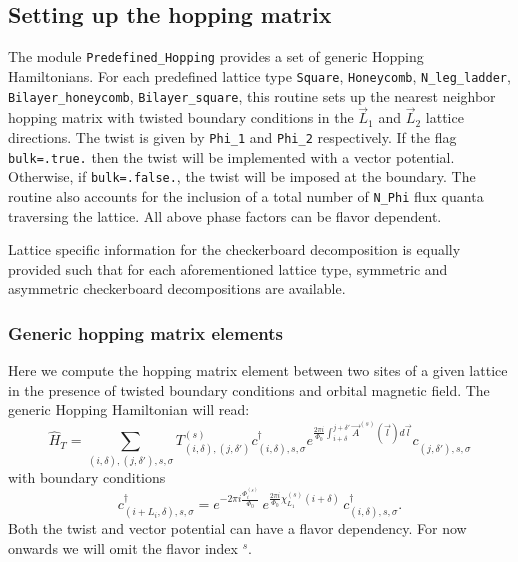 %
\subsection{ Setting up the hopping matrix }

The module \texttt{Predefined\_Hopping}   provides a set of generic Hopping Hamiltonians.    For each  predefined lattice type 
\texttt{Square}, \texttt{Honeycomb}, \texttt{N\_leg\_ladder},  \texttt{Bilayer\_honeycomb},  \texttt{Bilayer\_square},
    this routine sets  up the nearest  neighbor hopping matrix with twisted boundary conditions in the $\vec{L}_1$ and $\vec{L}_2$ lattice directions. The twist is given by 
\texttt{Phi\_1}  and \texttt{Phi\_2}  respectively.  If the flag  \texttt{bulk=.true.}   then   the twist will be implemented with a vector potential. Otherwise, if  \texttt{bulk=.false.}, the twist will be imposed at the boundary.   The routine also accounts for  the inclusion of a  total number of \texttt{N\_Phi}  flux quanta traversing the lattice.   All above phase factors  can be flavor dependent.  

Lattice specific information for the checkerboard  decomposition is   equally   provided such that for each aforementioned lattice type,  symmetric and asymmetric  checkerboard decompositions  are available.    

\subsubsection{Generic hopping matrix elements}\label{sec:generic_hopping}


Here we compute the hopping matrix element  between two sites of a given lattice  in the presence of twisted boundary conditions and  orbital magnetic field. 
The generic Hopping Hamiltonian will read: 
\begin{equation}
	   \hat{H}_T = \sum_{(i,\delta), (j,\delta'), s, \sigma}    T_{(i,\delta), (j,\delta')}^{(s)}    c^{\dagger}_{(i,\delta),s,\sigma }   e^{\frac{2 \pi i}{\Phi_0} \int_{i + \delta}^{j + \delta'}  \vec{A}^{(s)}(\vec{l})  d \vec{l}} c^{}_{(j,\delta'),s,\sigma }
\end{equation}
with boundary conditions 
\begin{equation}
	c^{\dagger}_{(i + L_i,\delta) ,s,\sigma }   =  e^{- 2 \pi i\frac{\Phi_i^{(s)}}{\Phi_0}} \, e^{\frac{2 \pi i }{\Phi_0} \chi^{(s)}_{L_1} ( i + \delta ) } \, c^{\dagger}_{(i,\delta) ,s,\sigma }.
\end{equation}
Both the twist and  vector  potential can have a flavor dependency. For  now onwards we will  omit the flavor index $^{s}$.  

